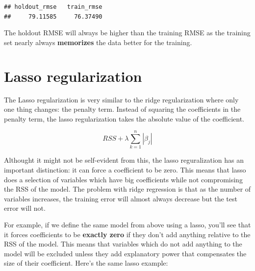 \documentclass[
]{book}
\begin{document}
\begin{verbatim}
## holdout_rmse   train_rmse 
##     79.11585     76.37490
\end{verbatim}

The holdout RMSE will always be higher than the training RMSE as the training set nearly always \textbf{memorizes} the data better for the training.

\hypertarget{lasso-regularization}{%
\section{Lasso regularization}\label{lasso-regularization}}

The Lasso regularization is very similar to the ridge regularization where only one thing changes: the penalty term. Instead of squaring the coefficients in the penalty term, the lasso regularization takes the absolute value of the coefficient.

\begin{equation}
RSS + \lambda \sum_{k = 1}^n |\beta_j|
\end{equation}

Althought it might not be self-evident from this, the lasso reguralization has an important distinction: it can force a coefficient to be zero. This means that lasso does a selection of variables which have big coefficients while not compromising the RSS of the model. The problem with ridge regression is that as the number of variables increases, the training error will almost always decrease but the test error will not.

For example, if we define the same model from above using a lasso, you'll see that it forces coefficients to be \textbf{exactly zero} if they don't add anything relative to the RSS of the model. This means that variables which do not add anything to the model will be excluded unless they add explanatory power that compensates the size of their coefficient. Here's the same lasso example:
\end{document}
